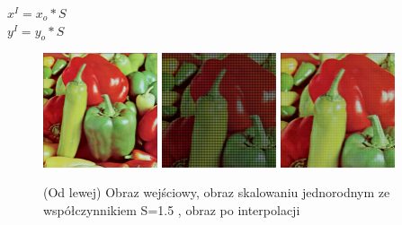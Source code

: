 \documentclass[final,a4paper,openany,12pt]{mwbk}
\begin{document}
	\begin{center}
		$x^I = x_{o} * S$ \\
		$y^I = y_{o} * S$
	\end{center}

\begin{figure}[H]
	\begin{center}
		\includegraphics[width=0.3\textwidth]{1/1Geo_ScaleJ_Original}
		\includegraphics[width=0.3\textwidth]{1/1Geo_ScaleJ_Result}
		\includegraphics[width=0.3\textwidth]{1/1Geo_ScaleJ_Result_Interp}
	\end{center}
	\caption{(Od lewej) Obraz wejściowy, obraz skalowaniu jednorodnym ze współczynnikiem S=1.5 , obraz po interpolacji }
\end{figure}
\end{document}
